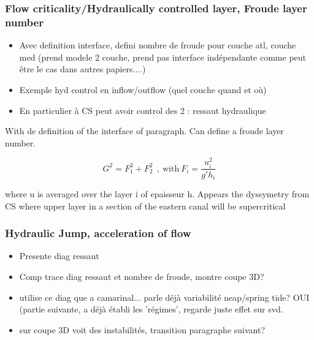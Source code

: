 \subsubsection{Flow criticality/Hydraulically controlled layer, Froude layer number}

\begin{itemize}
\item Avec definition interface, defini nombre de froude pour couche atl, couche med (prend modele 2 couche, prend pas interface indépendante comme peut être le cas dans autres papiers....)
\item Exemple hyd control en inflow/outflow (quel couche quand et où)
\item En particulier à CS peut avoir control des 2 : ressaut hydraulique
\end{itemize}

With de definition of the interface of paragraph. Can define a froude layer number. 

\begin{equation}
G^2=F_1^2+F_2^2 \ \ , \ \text{with} \ F_i=\frac{u_i^2}{g'h_i}
\end{equation}

where u is averaged over the layer i of epaisseur h. Appears the dyssymetry from CS where upper layer in a section of the eastern canal will be supercritical

\subsubsection{Hydraulic Jump, acceleration of flow}

\begin{itemize}
\item Presente diag ressaut
\item Comp trace diag ressaut et nombre de froude, montre coupe 3D?
\item utilise ce diag que a camarinal... parle déjà variabilité neap/spring tide? OUI (partie suivante, a déjà établi les 'régimes', regarde juste effet sur svd.
\item sur coupe 3D voit des instabilités, transition paragraphe suivant?
\end{itemize}

